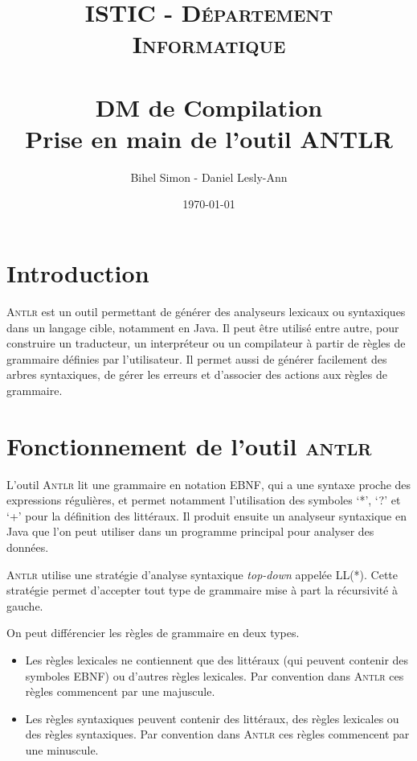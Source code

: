 \documentclass[paper=a4, fontsize=11pt]{scrartcl} %
\title{	
\normalfont \normalsize 
\textsc{ISTIC - Département Informatique} \\ [25pt]
\horrule{0.5pt} \\[0.4cm]
\huge DM de Compilation \\[0.2cm]
\Large Prise en main de l'outil ANTLR
\horrule{2pt} \\[0.5cm]
}
\author{Bihel Simon - Daniel Lesly-Ann}
\date{\normalsize\today}
\numberwithin{equation}{section} %
\numberwithin{figure}{section} %
\numberwithin{table}{section} %
\begin{document}
\maketitle


\section*{Introduction}
\textsc{Antlr} est un outil permettant de générer des analyseurs lexicaux ou syntaxiques dans un langage cible, notamment en Java. Il peut être utilisé entre autre, pour construire un traducteur, un interpréteur ou un compilateur à partir de règles de grammaire définies par l'utilisateur. Il permet aussi de générer facilement des arbres syntaxiques, de gérer les erreurs et d'associer des actions aux règles de grammaire.




\section{Fonctionnement de l'outil \textsc{antlr}}

L'outil \textsc{Antlr} lit une grammaire en notation EBNF, qui a une syntaxe
proche des expressions régulières, et permet notamment l'utilisation des
symboles `*', `?' et `+' pour la définition des littéraux. Il produit ensuite un
analyseur syntaxique en Java que l'on peut utiliser dans un programme principal
pour analyser des données.

\textsc{Antlr} utilise une stratégie d'analyse syntaxique \textit{top-down} 
appelée LL(*). Cette stratégie permet d'accepter tout type de grammaire mise à 
part la récursivité à gauche.

On peut différencier les règles de grammaire en deux types.
\begin{itemize}
 \item Les règles lexicales ne contiennent que des littéraux (qui peuvent 
 contenir des symboles EBNF) ou d'autres règles lexicales. Par convention dans 
 \textsc{Antlr} ces règles commencent par une majuscule.
 \item Les règles syntaxiques peuvent contenir des littéraux, des règles 
 lexicales ou des règles syntaxiques. Par convention dans \textsc{Antlr} ces 
 règles commencent par une minuscule.
\end{itemize}
\end{document}
